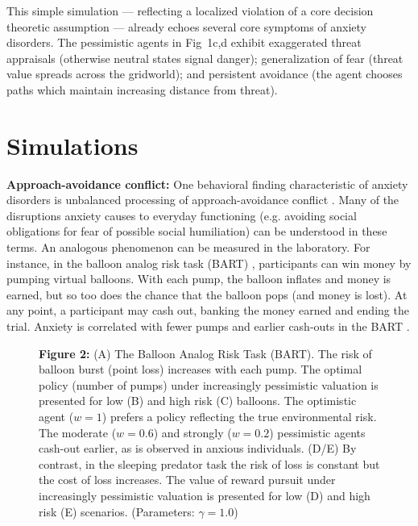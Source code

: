 \documentclass[11pt]{article} %
\begin{document}
This simple simulation --- reflecting a localized violation of a core decision theoretic assumption --- already echoes several core symptoms of anxiety disorders. The pessimistic agents in Fig~1c,d exhibit exaggerated threat appraisals (otherwise neutral states signal danger); generalization of fear (threat value spreads across the gridworld); and persistent avoidance (the agent chooses paths which maintain increasing distance from threat).

\section{Simulations}

\textbf{Approach-avoidance conflict:} One behavioral finding characteristic of anxiety disorders is unbalanced processing of approach-avoidance conflict \citep{aupperle2010}. Many of the disruptions anxiety causes to everyday functioning (e.g. avoiding social obligations for fear of possible social humiliation) can be understood in these terms. An analogous phenomenon can be measured in the laboratory. For instance, in the balloon analog risk task (BART) \citep{Lejuez2002}, participants can win money by pumping virtual balloons. With each pump, the balloon inflates and money is earned, but so too does the chance that the balloon pops (and money is lost). At any point, a participant may cash out, banking the money earned and ending the trial. Anxiety is correlated with fewer pumps and earlier cash-outs in the BART \citep{Maner2007, ramirez2015}.

\begin{figure}
  \centerline{%
  }
  \par \textbf{Figure 2:} (A) The Balloon Analog Risk Task (BART). The risk of balloon burst (point loss) increases with each pump. The optimal policy (number of pumps) under increasingly pessimistic valuation is presented for low (B) and high risk (C) balloons. The optimistic agent ($w=1$) prefers a policy reflecting the true environmental risk. The moderate ($w=0.6$) and strongly ($w=0.2$) pessimistic agents cash-out earlier, as is observed in anxious individuals. (D/E) By contrast, in the sleeping predator task the risk of loss is constant but the cost of loss increases. The value of reward pursuit under increasingly pessimistic valuation is presented for low (D) and high risk (E) scenarios. (Parameters: $\gamma = 1.0$)
\end{figure}
\end{document}
